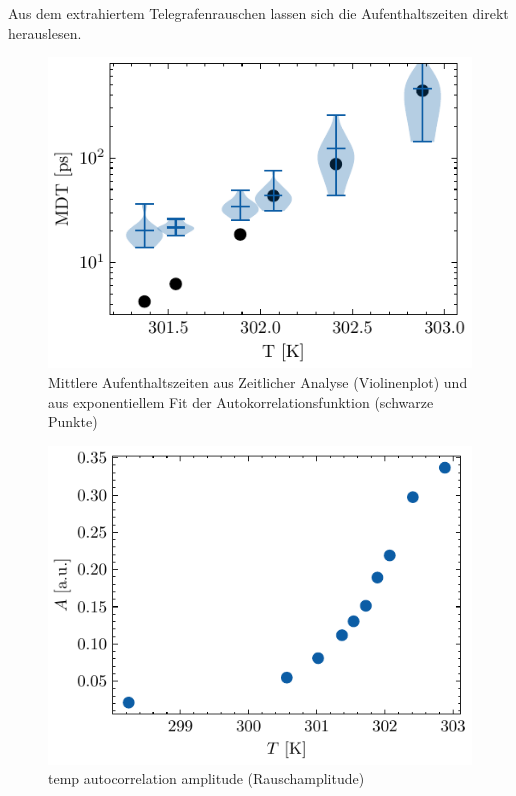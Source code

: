 \documentclass[main.tex]{subfiles}
\begin{document}
Aus dem extrahiertem Telegrafenrauschen lassen sich die Aufenthaltszeiten direkt herauslesen. 

\begin{figure}[H]
    \centering
    \includegraphics{bilder/plots/temp_comparison/mean_dwell_time_comparison.pdf}
    \caption{Mittlere Aufenthaltszeiten aus Zeitlicher Analyse (Violinenplot) und aus exponentiellem Fit der Autokorrelationsfunktion (schwarze Punkte)}\label{fig:temp-mdt-comp}
\end{figure}


\begin{figure}[H]
    \centering
    \includegraphics{bilder/plots/temp_comparison_long/rauschamplitude.pdf}
    \caption{temp autocorrelation amplitude (Rauschamplitude)}\label{fig:temp-autocorr-amplitude}
\end{figure}
\end{document}
